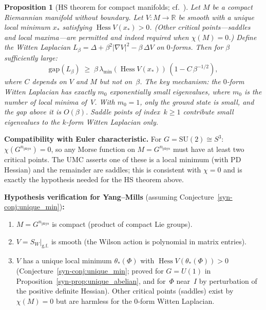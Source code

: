 \documentclass[11pt]{article}
\newtheorem{proposition}[theorem]{Proposition}
\theoremstyle{definition}
\newcommand{\SU}{\mathrm{SU}}
\newcommand{\R}{\mathbb{R}}
\newcommand{\Hess}{\operatorname{Hess}}
\newcommand{\gap}{\mathrm{gap}}
\begin{document}
\begin{proposition}[HS theorem for compact manifolds;
cf.~\cite{HelfferSjostrand,Helffer02}]
\label{syn-prop:hs}
Let $M$ be a compact Riemannian manifold without boundary.
Let $V \colon M \to \R$ be smooth with a
\emph{unique local minimum} $x_*$ satisfying
$\Hess V(x_*) > 0$.
\textup{(}Other critical points---saddles and local
maxima---are permitted and indeed required
when $\chi(M) = 0$.\textup{)}
Define the Witten Laplacian $L_\beta = \Delta
+ \beta^2 |\nabla V|^2 - \beta\,\Delta V$
on $0$-forms.
Then for $\beta$ sufficiently large:
\begin{equation}
  \gap(L_\beta) \;\geq\;
  \beta\,\lambda_{\min}(\Hess V(x_*))\,
  (1 - C\,\beta^{-1/2}),
\end{equation}
where $C$ depends on $V$ and $M$ but not on~$\beta$.
The key mechanism: the $0$-form Witten Laplacian has
exactly $m_0$ exponentially small eigenvalues,
where $m_0$ is the number of local minima of~$V$.
With $m_0 = 1$, only the ground state is small,
and the gap above it is $O(\beta)$.
Saddle points of index~$k \geq 1$ contribute small
eigenvalues to the $k$-form Witten Laplacian only.
\end{proposition}

\noindent
\textbf{Compatibility with Euler characteristic.}
For $G = \SU(2) \cong S^3$:
$\chi(G^{n_{\mathrm{phys}}}) = 0$, so any Morse
function on $M = G^{n_{\mathrm{phys}}}$ must have
at least two critical points.  The UMC asserts
one of these is a local minimum (with PD Hessian) and
the remainder are saddles; this is consistent with
$\chi = 0$ and is exactly the hypothesis needed for
the HS theorem above.

\noindent
\textbf{Hypothesis verification for Yang--Mills}
(assuming Conjecture~\ref{syn-conj:unique_min})\textbf{:}
\begin{enumerate}[label=(H\arabic*),nosep]
  \item $M = G^{n_{\mathrm{phys}}}$ is compact
    (product of compact Lie groups).
  \item $V = S_W|_{\mathrm{g.f.}}$ is smooth
    (the Wilson action is polynomial in matrix entries).
  \item $V$ has a unique local minimum $\theta_*(\Phi)$
    with $\Hess V(\theta_*(\Phi)) > 0$
    (Conjecture~\ref{syn-conj:unique_min}; proved for
    $G = U(1)$ in Proposition~\ref{syn-prop:unique_abelian},
    and for~$\Phi$ near~$I$ by perturbation of the
    positive definite Hessian).
    Other critical points (saddles) exist by
    $\chi(M) = 0$ but are harmless for the
    $0$-form Witten Laplacian.
\end{enumerate}
\end{document}
